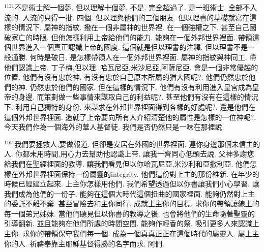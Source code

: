 \documentclass{book}
\begin{document}
$^{1121}$不是術士解一個夢.
但以理解十個夢.
不是.
完全超過了.
是一班術士.
全部不入流的.
入流的只得一批.
四個.
但以理與他們的三個朋友.
但以理書的基礎就寫在這樣的情況下.
屬神的指紋.
撥在一個非屬神的世界裡.
在一個強權之下.
甚至自己國破家亡的時限.
但他怎樣利用上帝給他們的能力.
能夠在一個外邦世界裡面.
帶領這個世界進入一個真正認識上帝的國度.
這個就是但以理書的注釋.
但以理書不是一般通勝.
何時是破日.
是怎樣帶領人在一個外邦世界裡面.
屬神的指紋與神同工.
帶他們認識上帝.
丁子梅,但以理.
哈瓦尼亞,米沙尼亞,阿薩尼亞.
會是一個非常優越的位置.
他們有沒有忠於神.
有沒有忠於自己原本所屬的猶大國呢?.
他們仍然忠於他們的神.
仍然忠於他們的國家.
但在這樣的情況下.
他們有沒有利用進入皇宮成為皇帝的身邊.
而策劃做一些事情來謀取自己的利益呢?.
甚至他們有沒有在這樣的情況下.
利用自己獨特的身份.
來謀求在外邦世界裡面得到各樣的好處呢?.
還是他們在這個外邦世界裡面.
造就了上帝要向所有人介紹清楚他的屬性是怎樣的一位神呢?.
今天我們作為一個海外的華人基督徒.
我們是否仍然只是一味在那裡說.

$^{1161}$我們要拯救人,要做報道.
但卻是安居在外國的世界裡面.
連你身邊那個未信主的人.
你都未用時間,用心力去幫助他認識上帝.
讓我一齊同心低頭去說.
父神多謝您給我們在聖經裡面的教導.
讓我們看見但以你哈瓦尼亞,米沙利和亞撒利亞.
他們怎樣在外邦世界裡面保持一份屬靈的integrity.
他們這份對上主的那份維新.
在年少的時候已經建立起來.
上主你怎樣用他們.
我們希望透過但以你書讓我們小心學習.
讓我們成為他們的一份子.
能夠在這個大時代這個扭曲的國家裡面.
能夠仍然對上主的委託不離不棄.
甚至冒險去和主你同行.
成就上主你的目標.
求你的帶領讓線上的每一個弟兄姊妹.
當他們聽見但以你書的教導之後.
也會將他們的生命隨著聖靈的引導翻新.
並且能夠在他們所處的時間空間.
能夠作輕香的祭.
吸引更多人來認識上主你.
求你的帶領保守我們每一個.
成為一個真真正正在這個時代的屬靈人.
屬上主你的人.
祈禱奉靠主耶穌基督得勝的名字而求.
阿們.
\newpage
\end{document}
